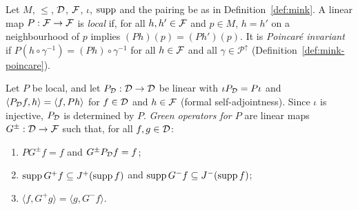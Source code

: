 \begin{definition}\label{def:kg-greenops}
Let $M$, $\le$, $\mathcal D$, $\mathcal F$, $\iota$, $\operatorname{supp}$ and the pairing be as in Definition~\ref{def:mink}. A
linear map $P:\mathcal F\to\mathcal F$ is \emph{local} if, for all $h,h'\in\mathcal F$ and $p\in M$, $h=h'$ on a
neighbourhood of $p$ implies $(Ph)(p)=(Ph')(p)$. It is \emph{Poincar\'e invariant} if
$P(h\circ\gamma^{-1})=(Ph)\circ\gamma^{-1}$ for all $h\in\mathcal F$ and all $\gamma\in\mathcal P^\uparrow$
(Definition~\ref{def:mink-poincare}).

Let $P$ be local, and let $P_\mathcal D:\mathcal D\to\mathcal D$ be linear with $\iota P_\mathcal D=P\iota$ and
$\langle P_\mathcal D f,h\rangle=\langle f,Ph\rangle$ for $f\in\mathcal D$ and $h\in\mathcal F$ (formal self-adjointness).
Since $\iota$ is injective, $P_\mathcal D$ is determined by $P$. \emph{Green operators for $P$} are linear
maps $G^\pm:\mathcal D\to\mathcal F$ such that, for all $f,g\in\mathcal D$:
\begin{enumerate}[label=(\alph*),leftmargin=2.5em]
\item $PG^\pm f=f$ and $G^\pm P_\mathcal D f=f$;
\item $\operatorname{supp} G^+f\subseteq J^+(\operatorname{supp} f)$ and $\operatorname{supp} G^-f\subseteq J^-(\operatorname{supp} f)$;
\item $\langle f,G^+g\rangle=\langle g,G^-f\rangle$.
\end{enumerate}
\end{definition}

